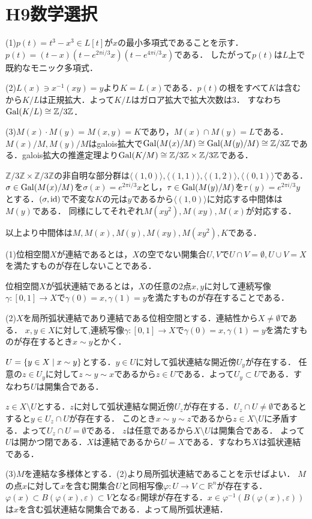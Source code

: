 \documentclass[
		book,
		head_space=20mm,
		foot_space=20mm,
		gutter=10mm,
		line_length=190mm
]{jlreq}
\begin{document}
\section{H9数学選択}
(1)$p(t)=t^3-x^3\in L[t]$が$x$の最小多項式であることを示す．
$p(t)=(t-x)(t-e^{2\pi i/3}x)(t-e^{4\pi i/3}x)$である．
したがって$p(t)$は$L$上で既約なモニック多項式．

(2)$L(x)\ni x^{-1} (xy)=y$より$K=L(x)$である．$p(t)$の根をすべて$K$は含むから$K/L$は正規拡大．よって$K/L$はガロア拡大で拡大次数は$3$．
すなわち$\mathop{\mathrm{Gal}}(K/L)\cong \mathbb{Z}/3\mathbb{Z}$．

(3)$M(x)\cdot M(y)=M(x,y)=K$であり，$M(x)\cap M(y)=L$である．$M(x)/M,M(y)/M$はgalois拡大で$\mathop{\mathrm{Gal}}(M(x)/M)\cong\mathop{\mathrm{Gal}}(M(y)/M)\cong \mathbb{Z}/3\mathbb{Z}$である．galois拡大の推進定理より$\mathop{\mathrm{Gal}}(K/M)\cong \mathbb{Z}/3\mathbb{Z}\times \mathbb{Z}/3\mathbb{Z}$である．

$\mathbb{Z}/3\mathbb{Z}\times \mathbb{Z}/3\mathbb{Z}$の非自明な部分群は$\langle (1,0)\rangle,\langle (1,1)\rangle,\langle (1,2)\rangle,\langle (0,1)\rangle$である．
$\sigma \in \mathop{\mathrm{Gal}}(M(x)/M)$を$\sigma(x)=e^{2\pi i/3}x$とし，$\tau \in \mathop{\mathrm{Gal}}(M(y)/M)$を$\tau(y)=e^{2\pi i/3}y$とする．$(\sigma,\mathop{\mathrm{id}})$で不変な$K$の元は$y$であるから$\langle (1,0)\rangle$に対応する中間体は$M(y)$である．
同様にしてそれぞれ$M(xy^2),M(xy),M(x)$が対応する．

以上より中間体は$M,M(x),M(y),M(xy),M(xy^2),K$である．

(1)位相空間$X$が連結であるとは，$X$の空でない開集合$U,V$で$U\cap V=\emptyset,U\cup V=X$を満たすものが存在しないことである．

位相空間$X$が弧状連結であるとは，$X$の任意の$2$点$x,y$に対して連続写像$\gamma:[0,1]\to X$で$\gamma(0)=x,\gamma(1)=y$を満たすものが存在することである．

(2)$X$を局所弧状連結であり連結である位相空間とする．連結性から$X\neq \emptyset$である．
$x,y \in X$に対して,連続写像$\gamma:[0,1]\to X$で$\gamma(0)=x,\gamma(1)=y$を満たすものが存在するとき$x \sim y$とかく．

$U=\left\{ y\in X\mathrel{}\middle|\mathrel{} x\sim y\right\}$とする．$y \in U$に対して弧状連結な開近傍$U_y$が存在する．
任意の$z \in U_y$に対して$z \sim y \sim x$であるから$z \in U$である．よって$U_y \subset U$である．すなわち$U$は開集合である．

$z \in X\setminus U$とする．$z$に対して弧状連結な開近傍$U_z$が存在する．$U_z \cap U \neq \emptyset$であるとすると$y \in U_z \cap U$が存在する．
このとき$x\sim y\sim z$であるから$z \in X \setminus U$に矛盾する．よって$U_z \cap U = \emptyset$である．
$z$は任意であるから$X\setminus U$は開集合である．
よって$U$は開かつ閉である．$X$は連結であるから$U=X$である．すなわち$X$は弧状連結である．

(3)$M$を連結な多様体とする．(2)より局所弧状連結であることを示せばよい．
$M$の点$x$に対して$x$を含む開集合$U$と同相写像$\varphi:U\to V\subset \mathbb{R}^n$が存在する．
$\varphi(x)\subset B(\varphi(x),\varepsilon)\subset V$となる$\varepsilon$開球が存在する．$x\in \varphi^{-1}(B(\varphi(x),\varepsilon))$は$x$を含む弧状連結な開集合である．よって局所弧状連結．
\end{document}
